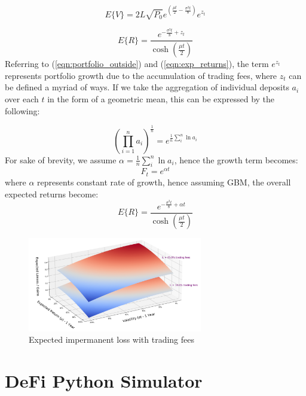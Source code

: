 \documentclass[journal,twocolumn,12pt]{ieeesyscoin}
\begin{document}
\lipsum[1]

\begin{equation}\label{eqn:portfolio_outside}
  E\{V\} = 2 L \sqrt{P_{0}}  e^{(\frac{\mu t}{2} - \frac{\sigma^2 t}{8})}e^{z_{t}}
\end{equation}

\begin{equation}\label{eqn:exp_returns}
  E\{R\} = \frac{e^{-\frac{\sigma^2 t}{8} + z_{t}}}{\cosh (\frac{\mu t}{2})}
\end{equation}
Referring to (\ref{eqn:portfolio_outside}) and (\ref{eqn:exp_returns}), the term $e^{z_{t}}$ represents portfolio growth due to the accumulation of trading fees, where $z_{t}$ can be defined a myriad of ways. If we take the aggregation of individual deposits $a_{i}$ over each $t$ in the form of a geometric mean, this can be expressed by the following:

\begin{equation}\label{eqn:geo_mean}
  (\prod_{i=1}^{n}a_{i})^{\frac{1}{n}} = e^{\frac{1}{n}\sum_{i}^{n}\ln a_{i}}
\end{equation}
For sake of brevity, we assume $\alpha = \frac{1}{n}\sum_{i}^{n}\ln a_{i}$, hence the growth term becomes:
\begin{equation}\label{eqn:geo_mean}
  F_{t} = e^{\alpha t}
\end{equation}
where $\alpha$ represents constant rate of growth, hence assuming GBM, the overall expected returns become:
\begin{equation}\label{eqn:exp_returns}
  E\{R\} = \frac{e^{-\frac{\sigma^2 t}{8} + \alpha t}}{\cosh (\frac{\mu t}{2})}
\end{equation}

\begin{figure}[h!]
\includegraphics[width=3in]{img/imp_loss_compounding_fees.png}
\caption{Expected impermanent loss with trading fees} 
\label{fig:daosys_protocol}
\end{figure}

\section{DeFi Python Simulator}
\label{sec:python_simulator}
\end{document}
